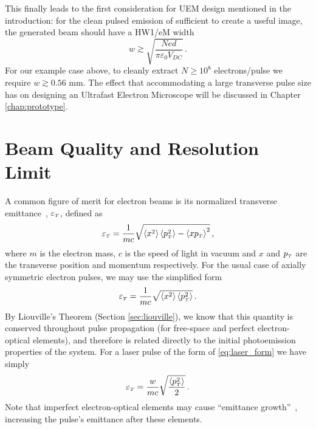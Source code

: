This finally leads to the first consideration for UEM design mentioned in the introduction: for the clean pulsed emission of sufficient to create a useful image, the generated beam should have a HW1/eM width 
\begin{equation} \label{eq:minimum_w}
  w \gtrsim \sqrt{\frac{N e d}{\pi \varepsilon_0 V_{DC}}} \,\text{.}
\end{equation}
For our example case above, to cleanly extract $N \ge 10^8$ electrons/pulse we require $w \gtrsim 0.56 \text{ mm}$.
The effect that accommodating a large transverse pulse size has on designing an Ultrafast Electron Microscope will be discussed in Chapter \ref{chap:prototype}. 

\section{Beam Quality and Resolution Limit} \label{sec:must_reduce_transverse_momentum}

A common figure of merit for electron beams is its normalized transverse emittance~\cite{jensen_emittance_2010}, $\varepsilon_{{\scriptscriptstyle T}}$, defined as 
\begin{equation}
  \varepsilon_{{\scriptscriptstyle T}} = \frac{1}{m c} \sqrt{ \left < x^2 \right > \left < p_{{\scriptscriptstyle T}}^2 \right > - \left < x p_{{\scriptscriptstyle T}} \right >^2 } \,\text{,}
\end{equation}
where $m$ is the electron mass, $c$ is the speed of light in vacuum and $x$ and $p_{{\scriptscriptstyle T}}$ are the transverse position and momentum respectively.
For the usual case of axially symmetric electron pulses, we may use the simplified form
\begin{equation} \label{eq:emittance_definition}
  \varepsilon_{{\scriptscriptstyle T}} = \frac{1}{m c} \sqrt{ \left < x^2 \right > \left < p_{{\scriptscriptstyle T}}^2 \right > } \,\text{.}
\end{equation}
By Liouville's Theorem (Section \ref{sec:liouville}), we know that this quantity is conserved throughout pulse propagation (for free-space and perfect electron-optical elements), and therefore is related directly to the initial photoemission properties of the system.
For a laser pulse of the form of \ref{eq:laser_form} we have simply
\begin{equation} \label{eq:emittance_definition_w}
  \varepsilon_{{\scriptscriptstyle T}} = \frac{w}{m c} \sqrt{ \frac{\left < p_{{\scriptscriptstyle T}}^2 \right >}{2} } \,\text{.}
\end{equation}
Note that imperfect electron-optical elements may cause ``emittance growth''~\cite{oshea_reversible_1998}, increasing the pulse's emittance after these elements.

